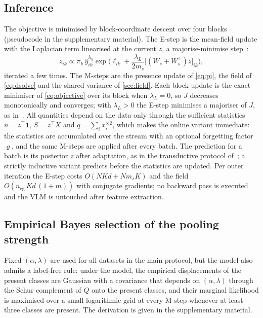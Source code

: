 \subsection{Inference}
\label{sec:inference}
The objective is minimised by block-coordinate descent over four blocks (pseudocode in the supplementary material). The E-step is the mean-field update with the Laplacian term linearised at the current $z$, a majorise-minimise step~\cite{hunter2004mm,ziko2020laplacianshot,zanella2024transclip}:
\begin{equation}
  z_{ik} \propto \pi_k\,\hat{y}_{ik}^{\lambda_y}\exp\Big(\ell_{ik} + \frac{\lambda_L}{2m_s}\big[(W_s + W_s^{\top})z\big]_{ik}\Big),
  \label{eq:estep}
\end{equation}
iterated a few times. The M-steps are the presence update of \cref{eq:pi}, the field of \cref{eq:dsolve} and the shared variance of \cref{sec:field}. Each block update is the exact minimiser of \cref{eq:objective} over its block when $\lambda_L=0$, so $J$ decreases monotonically and converges; with $\lambda_L>0$ the E-step minimises a majoriser of $J$, as in~\cite{zanella2024transclip}. All quantities depend on the data only through the sufficient statistics $n = z^{\top}\mathbf{1}$, $S = z^{\top}X$ and $q = \sum_i x_i^{\odot 2}$, which makes the online variant immediate: the statistics are accumulated over the stream with an optional forgetting factor $\varrho$, and the same M-steps are applied after every batch. The prediction for a batch is its posterior $z$ after adaptation, as in the transductive protocol of~\cite{zanella2025stata}; a strictly inductive variant predicts before the statistics are updated. Per outer iteration the E-step costs $O(NKd + N m_s K)$ and the field $O(n_{\mathrm{cg}}\,K d\,(1+m))$ with conjugate gradients; no backward pass is executed and the VLM is untouched after feature extraction.

\subsection{Empirical Bayes selection of the pooling strength}
\label{sec:eb}
Fixed $(\alpha,\lambda)$ are used for all datasets in the main protocol, but the model also admits a label-free rule: under the model, the empirical displacements of the present classes are Gaussian with a covariance that depends on $(\alpha,\lambda)$ through the Schur complement of $Q$ onto the present classes, and their marginal likelihood is maximised over a small logarithmic grid at every M-step whenever at least three classes are present. The derivation is given in the supplementary material.
